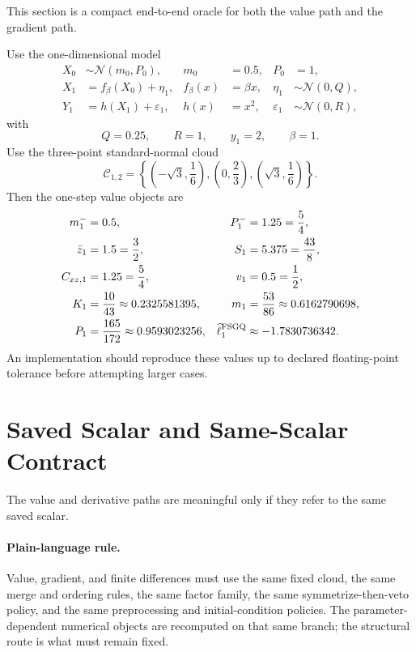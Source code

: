 \documentclass[11pt]{article}
\numberwithin{equation}{section}
\newcommand{\N}{\mathcal N}
\newcommand{\ellhat}{\widehat\ell}
\begin{document}
This section is a compact end-to-end oracle for both the value path and the
gradient path.

Use the one-dimensional model
\begin{align}
  X_0 &\sim \N(m_0,P_0),
  &m_0&=0.5,
  &P_0&=1,
  \label{eq:example-initial}\\
  X_1 &= f_\beta(X_0)+\eta_1,
  &f_\beta(x)&=\beta x,
  &\eta_1&\sim\N(0,Q),
  \label{eq:example-transition}\\
  Y_1 &= h(X_1)+\varepsilon_1,
  &h(x)&=x^2,
  &\varepsilon_1&\sim\N(0,R),
  \label{eq:example-observation}
\end{align}
with
\begin{equation}
  Q=0.25,
  \qquad
  R=1,
  \qquad
  y_1=2,
  \qquad
  \beta=1.
  \label{eq:example-QRy}
\end{equation}
Use the three-point standard-normal cloud
\begin{equation}
  \mathcal C_{1,2}
  =
  \left\{\left(-\sqrt3,\frac16\right),\left(0,\frac23\right),
  \left(\sqrt3,\frac16\right)\right\}.
  \label{eq:example-cloud}
\end{equation}
Then the one-step value objects are
\begin{align}
  m_1^- &= 0.5,
  &
  P_1^- &= 1.25 = \frac54,
  \label{eq:example-pred-moments}\\
  \bar z_1 &= 1.5 = \frac32,
  &
  S_1 &= 5.375 = \frac{43}{8},
  \label{eq:example-observation-moments}\\
  C_{xz,1} &= 1.25 = \frac54,
  &
  v_1 &= 0.5 = \frac12,
  \label{eq:example-cross-and-innovation}\\
  K_1 &= \frac{10}{43}\approx 0.2325581395,
  &
  m_1 &= \frac{53}{86}\approx 0.6162790698,
  \label{eq:example-gain-and-mean}\\
  P_1 &= \frac{165}{172}\approx 0.9593023256,
  &
  \ellhat_1^{\rm FSGQ} &\approx -1.7830736342.
  \label{eq:example-final-values}
\end{align}
An implementation should reproduce these values up to declared floating-point
tolerance before attempting larger cases.

\section{Saved Scalar and Same-Scalar Contract}
\label{sec:same-scalar-contract}

The value and derivative paths are meaningful only if they refer to the same
saved scalar.

\paragraph{Plain-language rule.}
Value, gradient, and finite differences must use the same fixed cloud, the same
merge and ordering rules, the same factor family, the same symmetrize-then-veto
policy, and the same preprocessing and initial-condition policies.  The
parameter-dependent numerical objects are recomputed on that same branch; the
structural route is what must remain fixed.
\end{document}
